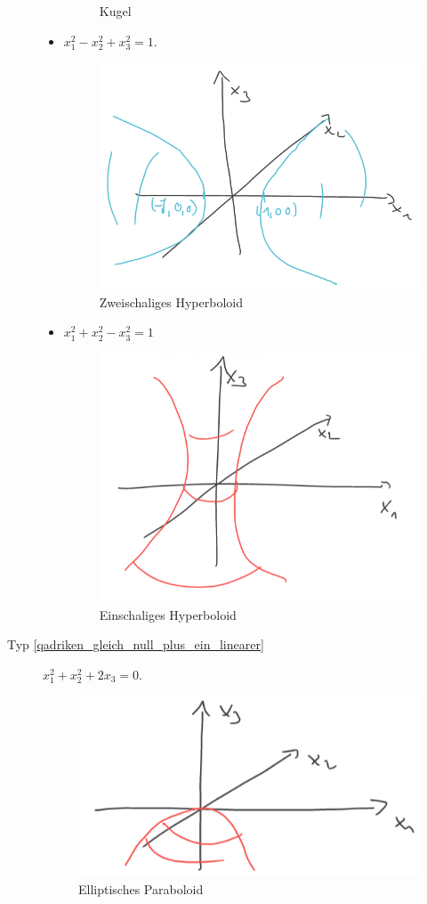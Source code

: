 \begin{beispiele*}
\begin{description}
\begin{itemize}
\begin{figure}[H]
        \caption*{Kugel}
        \label{fig:quadriken_beispiel_kugel}
      \end{figure}
      \item \( x_1^2-x_2^2+x_3^2=1 \).
      \begin{figure}[H]
        \centering
        \includegraphics[width=0.5\linewidth]{figures/quadriken_beispiel_zweischaliges_hyperboloid}
        \caption*{Zweischaliges Hyperboloid}
        \label{fig:quadriken_beispiel_zweischaliges_hyperboloid}
      \end{figure}
      \item \( x_1^2+x_2^2-x_3^2=1 \)
      \begin{figure}[H]
        \centering
        \includegraphics[width=0.5\linewidth]{figures/quadriken_beispiel_einschaliges_hyperboloid}
        \caption*{Einschaliges Hyperboloid}
        \label{fig:quadriken_beispiel_einschaliges_hyperboloid}
      \end{figure}
    \end{itemize}
    \item[Typ \ref{qadriken_gleich_null_plus_ein_linearer}] \( x_1^2+x_2^2+2x_3=0 \).
    \begin{figure}[H]
      \centering
      \includegraphics[width=0.5\linewidth]{figures/quadriken_beispiel_elliptisches_paraboloid}
      \caption*{Elliptisches Paraboloid}
      \label{fig:quadriken_beispiel_elliptisches_paraboloid}
    \end{figure}
  \end{description}
\end{beispiele*}
